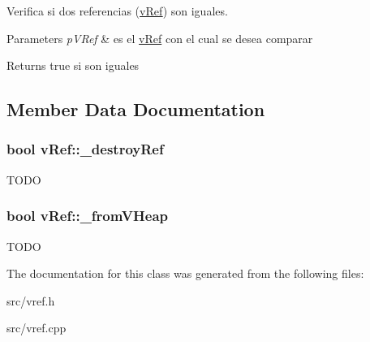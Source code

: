Verifica si dos referencias (\hyperlink{classv_ref}{v\-Ref}) son iguales. 


\begin{DoxyParams}{Parameters}
{\em p\-V\-Ref} & es el \hyperlink{classv_ref}{v\-Ref} con el cual se desea comparar \\
\hline
\end{DoxyParams}
\begin{DoxyReturn}{Returns}
true si son iguales 
\end{DoxyReturn}


\subsection{Member Data Documentation}
\hypertarget{classv_ref_a3f8a845f0e4623d38404e67ff51d8c5c}{
\subsubsection[{\-\_\-destroy\-Ref}]{\setlength{\rightskip}{0pt plus 5cm}bool v\-Ref\-::\-\_\-destroy\-Ref}}\label{classv_ref_a3f8a845f0e4623d38404e67ff51d8c5c}
T\-O\-D\-O \hypertarget{classv_ref_aaf5d33821d373d8b68daa73b00969c2c}{
\subsubsection[{\-\_\-from\-V\-Heap}]{\setlength{\rightskip}{0pt plus 5cm}bool v\-Ref\-::\-\_\-from\-V\-Heap}}\label{classv_ref_aaf5d33821d373d8b68daa73b00969c2c}
T\-O\-D\-O 

The documentation for this class was generated from the following files\-:\begin{DoxyCompactItemize}
\item 
src/vref.\-h\item 
src/vref.\-cpp\end{DoxyCompactItemize}
